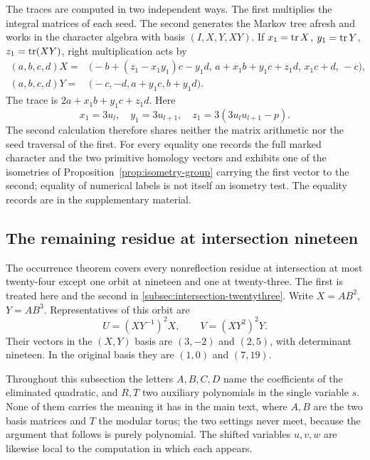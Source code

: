 The traces are computed in two independent ways. The first multiplies the integral matrices of each seed. The second generates the Markov tree afresh and works in the character algebra with basis $(I,X,Y,XY)$. If $x_1=\operatorname{tr} X$, $y_1=\operatorname{tr} Y$, $z_1=\operatorname{tr}(XY)$, right multiplication acts by
\begin{align}
 (a,b,c,d)X={}&\bigl(-b+(z_1-x_1y_1)c-y_1d,\,
 a+x_1b+y_1c+z_1d,\,x_1c+d,\,-c\bigr),
 \label{eq:character-X}\\
 (a,b,c,d)Y={}&\bigl(-c,-d,a+y_1c,b+y_1d\bigr).
 \label{eq:character-Y}
\end{align}
The trace is $2a+x_1b+y_1c+z_1d$. Here
$$
 x_1=3u_l,\quad y_1=3u_{l+1},\quad z_1=3(3u_lu_{l+1}-p).
$$
The second calculation therefore shares neither the matrix arithmetic nor the seed traversal of the first. For every equality one records the full marked character and the two primitive homology vectors and exhibits one of the isometries of Proposition~\ref{prop:isometry-group} carrying the first vector to the second; equality of numerical labels is not itself an isometry test. The equality records are in the supplementary material.

\subsection{The remaining residue at intersection nineteen}
\label{subsec:intersection-nineteen}

The occurrence theorem covers every nonreflection residue at intersection at most twenty-four except one orbit at nineteen and one at twenty-three. The first is treated here and the second in \ref{subsec:intersection-twentythree}. Write $X=AB^2$, $Y=AB^3$. Representatives of this orbit are
\begin{equation}
 U=(XY^{-1})^2X,\qquad V=(XY^2)^2Y.
 \label{eq:i19-words}
\end{equation}
Their vectors in the $(X,Y)$ basis are $(3,-2)$ and $(2,5)$, with determinant nineteen. In the original basis they are $(1,0)$ and $(7,19)$.

Throughout this subsection the letters $A,B,C,D$ name the coefficients of the eliminated quadratic, and $R,T$ two auxiliary polynomials in the single variable $s$. None of them carries the meaning it has in the main text, where $A,B$ are the two basis matrices and $T$ the modular torus; the two settings never meet, because the argument that follows is purely polynomial. The shifted variables $u,v,w$ are likewise local to the computation in which each appears.


